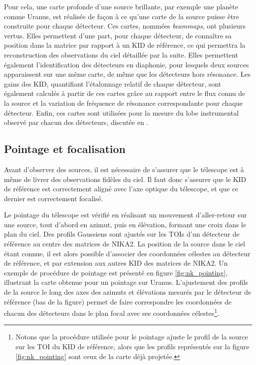 Pour cela, une carte profonde d'une source brillante, par exemple une planète comme Uranus, est réalisée de façon à ce qu'une carte de la source puisse être construite pour chaque détecteur.
Ces cartes, nommées \textit{beammaps}, ont plusieurs vertus.
Elles permettent d'une part, pour chaque détecteur, de connaître sa position dans la matrice par rapport à un KID de référence, ce qui permettra la reconstruction des observations du ciel détaillée par la suite.
Elles permettent également l'identification des détecteurs en diaphonie, pour lesquels deux sources apparaissent sur une même carte, de même que les détecteurs hors résonance.
Les gains des KID, quantifiant l'étalonnage relatif de chaque détecteur, sont également calculés à partir de ces cartes grâce au rapport entre le flux connu de la source et la variation de fréquence de résonance correspondante pour chaque détecteur.
Enfin, ces cartes sont utilisées pour la mesure du lobe instrumental observé par chacun des détecteurs, discutée en .

\subsection{Pointage et focalisation}\label{sec:pointing_focus}

Avant d'observer des sources, il est nécessaire de s'assurer que le télescope est à même de livrer des observations fidèles du ciel.
Il faut donc s'assurer que le KID de référence est correctement aligné avec l'axe optique du télescope, et que ce dernier est correctement focalisé.

Le pointage du télescope est vérifié en réalisant un mouvement d'aller-retour sur une source, tout d'abord en azimut, puis en élévation, formant une croix dans le plan du ciel.
Des profils Gaussiens sont ajustés sur les TOIs d'un détecteur de référence au centre des matrices de NIKA2.
La position de la source dans le ciel étant connue, il est alors possible d'associer des coordonnées célestes au détecteur de référence, et par extension aux autres KID des matrices de NIKA2.
Un exemple de procédure de pointage est présenté en figure \ref{fig:nk_pointing}, illustrant la carte obtenue pour un pointage sur Uranus.
L'ajustement des profils de la source le long des axes des azimuts et élévations mesurés par le détecteur de référence (bas de la figure) permet de faire correspondre les coordonnées de chacun des détecteurs dans le plan focal avec ses coordonnées célestes\footnote{Notons que la procédure utilisée pour le pointage ajuste le profil de la source sur les TOI du KID de référence, alors que les profils représentés sur la figure \ref{fig:nk_pointing} sont ceux de la carte déjà projetée.}.

